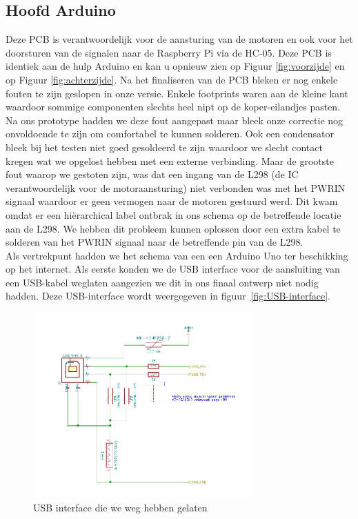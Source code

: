 \subsection{Hoofd Arduino}
Deze PCB is verantwoordelijk voor de aansturing van de motoren en ook voor het doorsturen van de signalen naar de Raspberry Pi via de HC-05. Deze PCB is identiek aan de hulp Arduino en kan u opnieuw zien op Figuur \ref{fig:voorzijde} en op Figuur \ref{fig:achterzijde}. Na het finaliseren van de PCB bleken er nog enkele fouten te zijn geslopen in onze versie. Enkele footprints waren aan de kleine kant waardoor sommige componenten slechts heel nipt op de koper-eilandjes pasten. Na ons prototype hadden we deze fout aangepast maar bleek onze correctie nog onvoldoende te zijn om comfortabel te kunnen solderen. Ook een condensator bleek bij het testen niet goed gesoldeerd te zijn waardoor we slecht contact kregen wat we opgelost hebben met een externe verbinding. Maar de grootste fout waarop we gestoten zijn, was dat een ingang van de L298 (de IC verantwoordelijk voor de motoraansturing) niet verbonden was met het PWRIN signaal waardoor er geen vermogen naar de motoren gestuurd werd. Dit kwam omdat er een hi\"erarchical label ontbrak in ons schema op de betreffende locatie aan de L298. We hebben dit probleem kunnen oplossen door een extra kabel te solderen van het PWRIN signaal naar de betreffende pin van de L298. \\
Als vertrekpunt hadden we het schema van een een Arduino Uno ter beschikking op het internet. Als eerste konden we de USB interface voor de aansluiting van een USB-kabel weglaten aangezien we dit in ons finaal ontwerp niet nodig hadden. Deze USB-interface wordt weergegeven in figuur~\ref{fig:USB-interface}.
\begin{figure}[h]
\centering
\includegraphics[width=0.75\textwidth]{USB_Interface.png}
\caption{USB interface die we weg hebben gelaten}
\label{fig:USB}
\end{figure}
